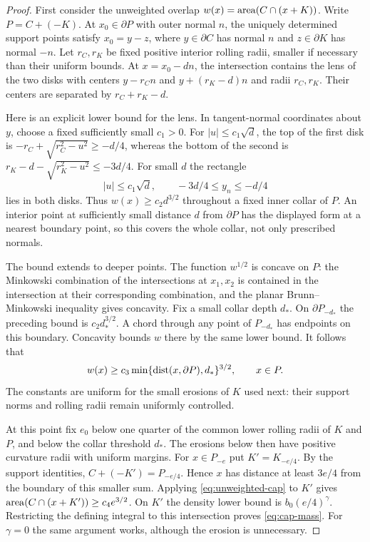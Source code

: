 \begin{proof}
First consider the unweighted overlap
$w(x)=\operatorname{area}(C\cap(x+K))$. Write $P=C+(-K)$.
At $x_0\in\partial P$ with outer normal $n$, the uniquely determined
support points satisfy $x_0=y-z$, where $y\in\partial C$ has normal
$n$ and $z\in\partial K$ has normal $-n$. Let $r_C,r_K$ be fixed
positive interior rolling radii, smaller if necessary than their
uniform bounds. At $x=x_0-dn$, the intersection contains the lens of
the two disks with centers $y-r_Cn$ and $y+(r_K-d)n$ and radii
$r_C,r_K$. Their centers are separated by $r_C+r_K-d$.

Here is an explicit lower bound for the lens. In tangent-normal
coordinates about $y$, choose a fixed sufficiently small $c_1>0$.
For $|u|\le c_1\sqrt d$, the top of the first disk is
$-r_C+\sqrt{r_C^2-u^2}\ge-d/4$, whereas the bottom of the second is
$r_K-d-\sqrt{r_K^2-u^2}\le-3d/4$. For small $d$ the rectangle
\[
                  |u|\le c_1\sqrt d,\qquad
                         -3d/4\le y_n\le-d/4
\]
lies in both disks. Thus $w(x)\ge c_2d^{3/2}$ throughout a fixed
inner collar of $P$. An interior point at sufficiently small distance
$d$ from $\partial P$ has the displayed form at a nearest boundary
point, so this covers the whole collar, not only prescribed normals.

The bound extends to deeper points. The function $w^{1/2}$ is concave
on $P$: the Minkowski combination of the intersections at $x_1,x_2$
is contained in the intersection at their corresponding combination,
and the planar Brunn--Minkowski inequality gives concavity. Fix a small
collar depth $d_*$. On $\partial P_{-d_*}$ the preceding bound is
$c_2d_*^{3/2}$. A chord through any point of $P_{-d_*}$ has endpoints
on this boundary. Concavity bounds $w$ there by the same lower bound.
It follows that
\begin{equation}\label{eq:unweighted-cap}
 w(x)\ge c_3\min\{\operatorname{dist}(x,\partial P),d_*\}^{3/2},\qquad x\in P.
\end{equation}
The constants are uniform for the small erosions of $K$ used next:
their support norms and rolling radii remain uniformly controlled.

At this point fix $e_0$ below one quarter of the common lower
rolling radii of $K$ and $P$, and below the collar threshold $d_*$.
The erosions below then have positive curvature radii with uniform
margins. For $x\in P_{-e}$ put $K'=K_{-e/4}$. By the support identities,
$C+(-K')=P_{-e/4}$. Hence $x$ has distance at least $3e/4$ from
the boundary of this smaller sum. Applying \eqref{eq:unweighted-cap}
to $K'$ gives
$\operatorname{area}(C\cap(x+K'))\ge c_4e^{3/2}$. On $K'$ the density lower
bound is $b_0(e/4)^\gamma$. Restricting the defining integral to
this intersection proves \eqref{eq:cap-mass}. For $\gamma=0$ the
same argument works, although the erosion is unnecessary.
\end{proof}


